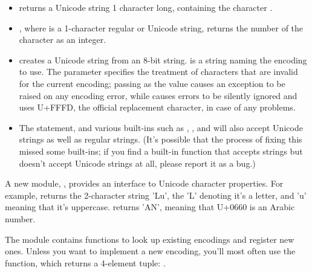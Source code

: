 \documentclass{howto}
\begin{document}
\begin{itemize}
\item {} returns a Unicode string 1 character
long, containing the character .

\item {}, where  is a 1-character regular or Unicode string, returns the number of the character as an integer.

\item {} creates a Unicode string from an 8-bit
string.   is a string naming the encoding to use.
The  parameter specifies the treatment of characters that
are invalid for the current encoding; passing  as the
value causes an exception to be raised on any encoding error, while
 causes errors to be silently ignored and
 uses U+FFFD, the official replacement character, in
case of any problems.

\item The  statement, and various built-ins such as
, , and  will also
accept Unicode strings as well as regular strings.  (It's possible
that the process of fixing this missed some built-ins; if you find a
built-in function that accepts strings but doesn't accept Unicode
strings at all, please report it as a bug.)

\end{itemize}

A new module, , provides an interface to Unicode
character properties.  For example, 
returns the 2-character string 'Lu', the 'L' denoting it's a letter,
and 'u' meaning that it's uppercase.
 returns 'AN', meaning that U+0660 is
an Arabic number.

The  module contains functions to look up existing encodings
and register new ones.  Unless you want to implement a
new encoding, you'll most often use the
 function, which returns a
4-element tuple: .
\end{document}
